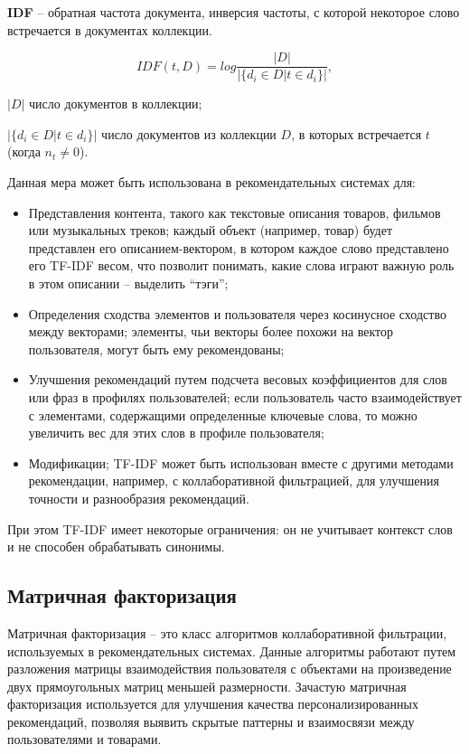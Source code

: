 \textbf{IDF} -- обратная частота документа, инверсия частоты, с которой некоторое слово встречается в документах коллекции.

\begin{equation}
	IDF(t, D) = log \frac{|D|}{|\{d_i \in D | t \in d_i\}|},
\end{equation}
\begin{eqexpl}[15mm]
\item{$|D|$} число документов в коллекции;
\item{$|\{d_i \in D | t \in d_i\}|$} число документов из коллекции $D$, в которых встречается $t$ (когда $n_t \neq 0$).
\end{eqexpl}

Данная мера может быть использована в рекомендательных системах для:

\begin{itemize}
	\item Представления контента, такого как текстовые описания товаров, фильмов или музыкальных треков; каждый объект (например, товар) будет представлен его описанием-вектором, в котором каждое слово представлено его TF-IDF весом, что позволит понимать, какие слова играют важную роль в этом описании -- выделить ``тэги'';
	\item Определения сходства элементов и пользователя через косинусное сходство между векторами; элементы, чьи векторы более похожи на вектор пользователя, могут быть ему рекомендованы;
	\item Улучшения рекомендаций путем подсчета весовых коэффициентов для слов или фраз в профилях пользователей; если пользователь часто взаимодействует с элементами, содержащими определенные ключевые слова, то можно увеличить вес для этих слов в профиле пользователя;
	\item Модификации; TF-IDF может быть использован вместе с другими методами рекомендации, например, с коллаборативной фильтрацией, для улучшения точности и разнообразия рекомендаций.
\end{itemize}

При этом TF-IDF имеет некоторые ограничения: он не учитывает контекст слов и не способен обрабатывать синонимы. \cite{tfidf}

\subsection{Матричная факторизация}
Матричная факторизация -- это класс алгоритмов коллаборативной фильтрации, используемых в рекомендательных системах. Данные алгоритмы работают путем разложения матрицы взаимодействия пользователя с объектами на произведение двух прямоугольных матриц меньшей размерности. Зачастую матричная факторизация используется для улучшения качества персонализированных рекомендаций, позволяя выявить скрытые паттерны и взаимосвязи между пользователями и товарами.\cite{factorization}

